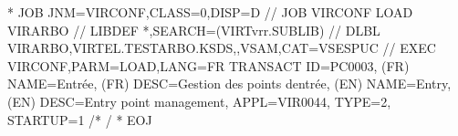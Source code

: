 \documentclass[letterpaper,10pt,english]{sphinxmanual}
\begin{document}
\begin{sphinxVerbatim}[commandchars=\\\{\}]
* \PYGZdl{}\PYGZdl{} JOB JNM=VIRCONF,CLASS=0,DISP=D
// JOB VIRCONF LOAD VIRARBO
// LIBDEF *,SEARCH=(VIRTvrr.SUBLIB)
// DLBL VIRARBO,\PYGZsq{}VIRTEL.TESTARBO.KSDS\PYGZsq{},,VSAM,CAT=VSESPUC
// EXEC VIRCONF,PARM=\PYGZsq{}LOAD,LANG=FR\PYGZsq{}
        TRANSACT ID=PC\PYGZhy{}0003, \PYGZhy{}
        (FR) NAME=\PYGZsq{}Entrée\PYGZsq{}, \PYGZhy{}
        (FR) DESC=\PYGZdq{}Gestion des points d\PYGZsq{}entrée\PYGZdq{}, \PYGZhy{}
        (EN) NAME=\PYGZsq{}Entry\PYGZsq{}, \PYGZhy{}
        (EN) DESC=\PYGZsq{}Entry point management\PYGZsq{}, \PYGZhy{}
        APPL=VIR0044, \PYGZhy{}
        TYPE=2, \PYGZhy{}
        STARTUP=1
/*
/\PYGZam{}
* \PYGZdl{}\PYGZdl{} EOJ
\end{sphinxVerbatim}

\end{document}
